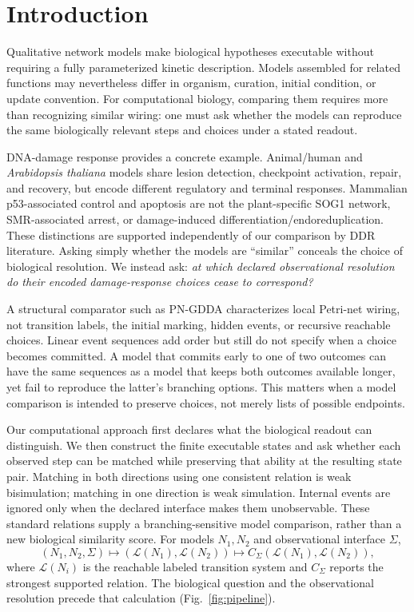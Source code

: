 \documentclass{ws-jbcb}
\numberwithin{equation}{section}
\newcommand{\tas}{\textit{Arabidopsis thaliana}}
\newcommand{\LTS}{\mathcal{L}}
\begin{document}
\section{Introduction}\label{sec:introduction}

Qualitative network models make biological hypotheses executable without
requiring a fully parameterized kinetic description. Models assembled for
related functions may nevertheless differ in organism, curation, initial
condition, or update convention. For computational biology, comparing them
requires more than recognizing similar wiring: one must ask whether the models
can reproduce the same biologically relevant steps and choices under a stated
readout.\cite{ChaouiyaPetriBio2007,Li2006,Fisher2007}

DNA-damage response provides a concrete example. Animal/human and
\tas{} models share lesion detection, checkpoint activation, repair, and
recovery, but encode different regulatory and terminal responses. Mammalian
p53-associated control and apoptosis are not the plant-specific SOG1 network,
SMR-associated arrest, or damage-induced differentiation/endoreduplication.
These distinctions are supported independently of our comparison by DDR
literature.\cite{JacksonBartek2009,BlackfordJackson2017,Yoshiyama2013,
DeSchutter2007,Yi2014,Adachi2011} Asking simply whether the models are
``similar'' conceals the choice of biological resolution. We instead ask:
\emph{at which declared observational resolution do their encoded
damage-response choices cease to correspond?}

A structural comparator such as PN-GDDA characterizes local Petri-net wiring,
not transition labels, the initial marking, hidden events, or recursive
reachable choices.\cite{Szawulak2022} Linear event sequences add order but
still do not specify when a choice becomes committed. A model that commits
early to one of two outcomes can have the same sequences as a model that keeps
both outcomes available longer, yet fail to reproduce the latter's branching
options. This matters when a model comparison is intended to preserve choices,
not merely lists of possible endpoints.

Our computational approach first declares what the biological readout can
distinguish. We then construct the finite executable states and ask whether
each observed step can be matched while preserving that ability at the
resulting state pair. Matching in both directions using one consistent relation
is weak bisimulation; matching in one direction is weak simulation. Internal
events are ignored only when the declared interface makes them unobservable.
These standard relations\cite{Milner1989,Sangiorgi2011} supply a
branching-sensitive model comparison, rather than a new biological similarity
score. For models $N_1,N_2$ and observational interface $\Sigma$,
\begin{equation}\label{eq:comparison-map}
 (N_1,N_2,\Sigma)\longmapsto(\LTS(N_1),\LTS(N_2))
 \longmapsto C_\Sigma(\LTS(N_1),\LTS(N_2)),
\end{equation}
where $\LTS(N_i)$ is the reachable labeled transition system and $C_\Sigma$
reports the strongest supported relation. The biological question and the
observational resolution precede that calculation (Fig.~\ref{fig:pipeline}).
\end{document}
